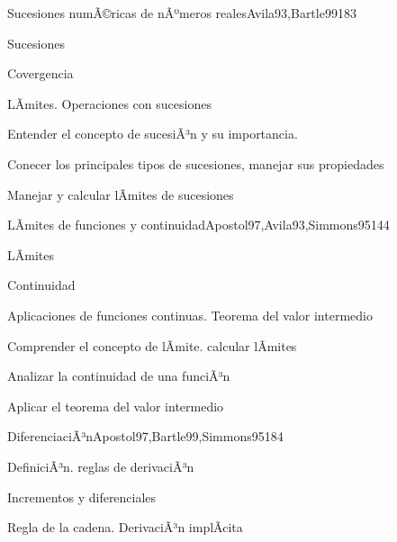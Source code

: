\begin{syllabus}
\begin{unit}{Sucesiones numÃ©ricas de nÃºmeros reales}{Avila93,Bartle99}{18}{3}
   \begin{topics}
      \item Sucesiones
      \item Covergencia
      \item LÃ­mites. Operaciones con sucesiones
   \end{topics}

   \begin{learningoutcomes}
      \item Entender el concepto de sucesiÃ³n y su importancia.
      \item Conecer los principales tipos de sucesiones, manejar sus propiedades
      \item Manejar y calcular lÃ­mites de sucesiones
      \end{learningoutcomes}
\end{unit}

\begin{unit}{LÃ­mites de funciones y continuidad}{Apostol97,Avila93,Simmons95}{14}{4}
   \begin{topics}
      \item LÃ­mites
      \item Continuidad
      \item Aplicaciones de funciones continuas. Teorema del valor intermedio
   \end{topics}

   \begin{learningoutcomes}
      \item Comprender el concepto de lÃ­mite. calcular lÃ­mites
      \item Analizar la continuidad de una funciÃ³n
      \item Aplicar el teorema del valor intermedio
      \end{learningoutcomes}
\end{unit}

\begin{unit}{DiferenciaciÃ³n}{Apostol97,Bartle99,Simmons95}{18}{4}
   \begin{topics}
      \item DefiniciÃ³n. reglas de derivaciÃ³n
      \item Incrementos y diferenciales
      \item Regla de la cadena. DerivaciÃ³n implÃ­cita
   \end{topics}


\end{unit}
\end{syllabus}
